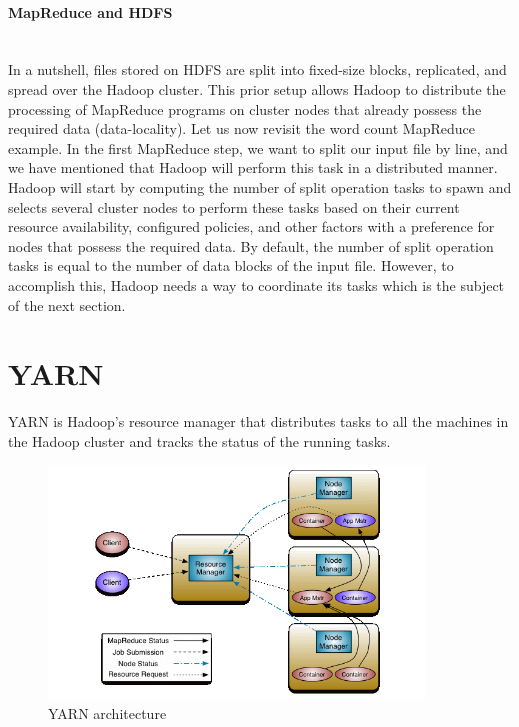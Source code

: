 \documentclass[12pt,english]{book}
\begin{document}
\paragraph{MapReduce and HDFS}\mbox{}\\

In a nutshell, files stored on HDFS are split into fixed-size blocks, replicated, and spread over the Hadoop cluster.
This prior setup allows Hadoop to distribute the processing of MapReduce programs on cluster nodes that already possess the required data (data-locality).
Let us now revisit the word count MapReduce example.
In the first MapReduce step, we want to split our input file by line, and we
have mentioned that Hadoop will perform this task in a distributed manner.
Hadoop will start by computing the number of split operation tasks to spawn and selects several cluster nodes to perform these tasks based on their current resource availability, configured policies, and other factors with a preference for nodes that possess the required data.
By default, the number of split operation tasks is equal to the number of data blocks of the input file.
However, to accomplish this, Hadoop needs a way to coordinate its tasks which is the subject of the next section.

\section{YARN}

YARN is Hadoop's resource manager that distributes tasks to all the machines in the Hadoop cluster and tracks the status of the running tasks.

\begin{figure}[ht]
	\centering
	\includegraphics[width=10cm]{yarnArch.png}
	\caption[YARN architecture]{YARN architecture \footnotemark}
\label{fig:YARNarchitecture}
\end{figure}
\end{document}
